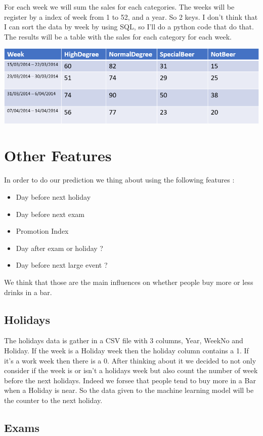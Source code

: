 \documentclass{report}
\begin{document}
For each week we will sum the sales for each categories. The weeks will be register by a index of week from 1 to 52, and a year. So 2 keys. 
I don't think that I can sort the data by week by using SQL, so I'll do a python code that do that. The results will be a table with the sales for each category for each week.


\includegraphics[scale = 0.8]{FormatTable}

\section{Other Features}

In order to do our prediction we thing about using the following features :
\begin{itemize}
\item Day before next holiday 
\item Day before next exam
\item Promotion Index
\item Day after exam or holiday ?
\item Day before next large event ?
\end{itemize}

We think that those are the main influences on whether people buy more or less drinks in a bar.

\subsection{Holidays}

The holidays data is gather in a CSV file with 3 columns, Year, WeekNo and Holiday. If the week is a Holiday week then the holiday column contains a 1. If it's a work week then there is a 0. After thinking about it we decided to not only consider if the week is or isn't a holidays week but also count the number of week before the next holidays. Indeed we forsee that people tend to buy more in a Bar when a Holiday is near.
So the data given to the machine learning model will be the counter to the next holiday.

\subsection{Exams}
\end{document}
